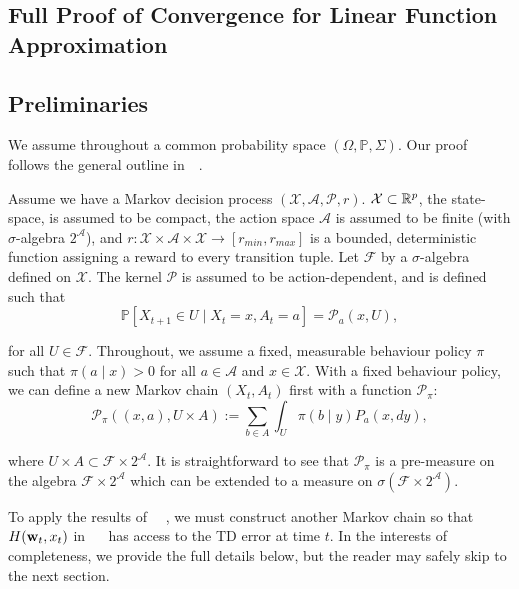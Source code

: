 \begin{appendices}

\section{Full Proof of Convergence for Linear Function Approximation}\label{appdx:convergence}
\subsection{Preliminaries}
We assume throughout a common probability space $(\Omega, \mathbb{P}, \Sigma)$. Our proof follows the general outline in~\citeauthor{melo2007q}~.

Assume we have a Markov decision process $(\mathcal{X}, \mathcal{A}, \mathcal{P}, r)$. $\mathcal{X} \subset \mathbb{R}^p$, the state-space, is assumed to be compact, the action space $\mathcal{A}$ is assumed to be finite (with $\sigma$-algebra $2^{\mathcal{A}}$), and $r : \mathcal{X} \times \mathcal{A} \times \mathcal{X} \to [r_{min}, r_{max}]$ is a bounded, deterministic function assigning a reward to every transition tuple. Let $\mathcal{F}$ by a $\sigma$-algebra defined on $\mathcal{X}$. The kernel $\mathcal{P}$ is assumed to be action-dependent, and is defined such that
\begin{equation*}
    \mathbb{P}[X_{t + 1} \in U \mid X_t = x, A_t = a] = \mathcal{P}_a(x, U),
\end{equation*}

\noindent for all $U \in \mathcal{F}$. Throughout, we assume a fixed, measurable behaviour policy $\pi$ such that $\pi(a \mid x) > 0$ for all $a \in \mathcal{A}$ and $x \in \mathcal{X}$. With a fixed behaviour policy, we can define a new Markov chain $(X_t, A_t)$ first with a function $\mathcal{P}_\pi$:
\begin{equation*}
    \mathcal{P}_\pi((x, a), U \times A) := \sum_{b \in A} \int_U \pi(b \mid y) P_a(x, dy),
\end{equation*}

\noindent where $U \times A \subset \mathcal{F} \times 2^\mathcal{A}$. It is straightforward to see that $\mathcal{P}_\pi$ is a pre-measure on the algebra $\mathcal{F} \times 2^\mathcal{A}$ which can be extended to a measure on $\sigma(\mathcal{F} \times 2^\mathcal{A})$.

\noindent To apply the results of ~\citeauthor{benveniste1990stochastic}~, we must construct another Markov chain so that $H(\mathbf{w}_t, x_t)$ in ~\citeauthor[p.213]{benveniste1990stochastic}~ has access to the TD error at time $t$. In the interests of completeness, we provide the full details below, but the reader may safely skip to the next section.


\end{appendices}
